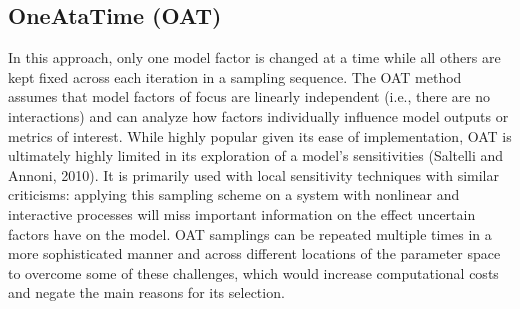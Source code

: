 \documentclass[letterpaper,10pt,english]{sphinxmanual}
\begin{document}
\subsection{One\sphinxhyphen{}At\sphinxhyphen{}a\sphinxhyphen{}Time (OAT)}
\label{\detokenize{3_sensitivity_analysis_the_basics:one-at-a-time-oat}}
\sphinxAtStartPar
In this approach, only one model factor is changed at a time while all others are kept fixed across each iteration in a sampling sequence. The OAT method assumes that model factors of focus are linearly independent (i.e., there are no interactions) and can analyze how factors individually influence model outputs or metrics of interest. While highly popular given its ease of implementation, OAT  is ultimately highly limited in its exploration of a model’s sensitivities (Saltelli and Annoni, 2010). It is primarily used with local sensitivity techniques with similar criticisms: applying this sampling scheme on a system with nonlinear and interactive processes will miss important information on the effect uncertain factors have on the model. OAT samplings can be repeated multiple times in a more sophisticated manner and across different locations of the parameter space to overcome some of these challenges, which would increase computational costs and negate the main reasons for its selection.
\end{document}

